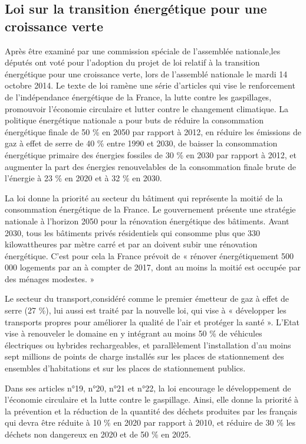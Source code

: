 \subsection{Loi sur la transition énergétique pour une croissance verte}
Après être examiné par une commission spéciale de l'assemblée nationale,les députés ont voté pour l’adoption du projet de loi relatif à la transition énergétique pour une croissance verte, lors de l’assemblé nationale le mardi 14 octobre 2014. Le texte de loi ramène une série d’articles qui vise le renforcement de l’indépendance énergétique de la France, la lutte contre les gaspillages, promouvoir l’économie circulaire et lutter contre le changement climatique.
La politique énergétique nationale a pour buts de réduire la consommation énergétique finale de 50 \% en 2050 par rapport à 2012, en réduire les émissions de gaz à effet de serre de 40 \% entre 1990 et 2030, de baisser la consommation énergétique primaire des énergies fossiles de 30 \% en 2030 par rapport à 2012, et augmenter la part des énergies renouvelables de la consommation finale brute de l’énergie à 23 \% en 2020 et à 32 \% en 2030.

La loi donne la priorité au secteur du bâtiment qui représente la moitié de la consommation énergétique de la France. Le gouvernement présente une stratégie nationale à l’horizon 2050 pour la rénovation énergétique des bâtiments. Avant 2030, tous les bâtiments privés résidentiels qui consomme plus que 330 kilowattheures par mètre carré et par an doivent subir une rénovation énergétique. C’est pour cela la France prévoit de « rénover énergétiquement 500 000 logements par an à compter de 2017, dont au moins la moitié est occupée par des ménages modestes. »

Le secteur du transport,considéré comme le premier émetteur de gaz à effet de serre (27 \%), lui aussi est traité par la nouvelle loi, qui vise à « développer les transports propres pour améliorer la qualité de l’air et protéger la santé ». L’Etat vise à renouveler le domaine en y intégrant au moins 50 \% de véhicules électriques ou hybrides rechargeables, et parallèlement l’installation d’au moins sept millions de points de charge installés sur les places de stationnement des ensembles d’habitations et sur les places de stationnement publics.

Dans ses articles n°19, n°20, n°21 et n°22, la loi encourage le développement de l’économie circulaire et la lutte contre le gaspillage. Ainsi, elle donne la priorité à la prévention et la réduction de la quantité des déchets produites par les français qui devra être réduite à 10 \%  en 2020 par rapport à 2010, et réduire de 30 \% les déchets non dangereux en 2020 et de 50 \% en 2025.

